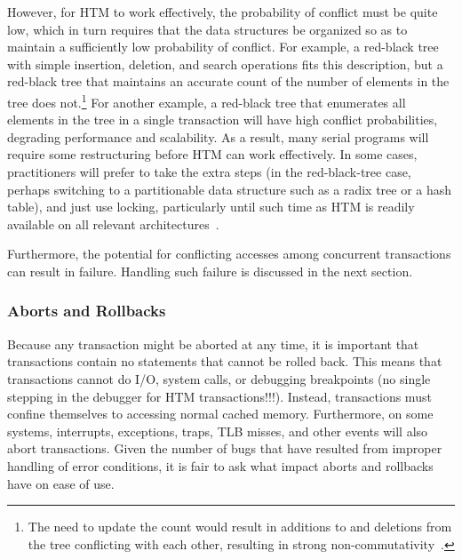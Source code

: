 However, for HTM to work effectively, the probability of conflict must
be quite low, which in turn requires that the data structures
be organized so as to maintain a sufficiently low probability of conflict.
For example, a red-black tree with simple insertion, deletion, and search
operations fits this description, but a red-black
tree that maintains an accurate count of the number of elements in
the tree does not.\footnote{
	The need to update the count would result in additions to and
	deletions from the tree conflicting with each other, resulting
	in strong non-commutativity~\cite{HagitAttiya2011LawsOfOrder,Attiya:2011:LOE:1925844.1926442,PaulEMcKenney2011SNC}.}
For another example, a red-black tree that enumerates all elements in
the tree in a single transaction will have high conflict probabilities,
degrading performance and scalability.
As a result, many serial programs will require some restructuring before
HTM can work effectively.
In some cases, practitioners will prefer to take the extra steps
(in the red-black-tree case, perhaps switching to a partitionable
data structure such as a radix tree or a hash table), and just
use locking, particularly until such time as HTM is readily available
on all relevant
architectures~\cite{CliffClick2009AzulHTM}.

\QuickQuizEnd

Furthermore, the potential for conflicting accesses among concurrent
transactions can result in failure.
Handling such failure is discussed in the next section.

\subsubsection{Aborts and Rollbacks}
\label{sec:future:Aborts and Rollbacks}

Because any transaction might be aborted at any time, it is important
that transactions contain no statements that cannot be rolled back.
This means that transactions cannot do I/O, system calls, or debugging
breakpoints (no single stepping in the debugger for HTM transactions!!!).
Instead, transactions must confine themselves to accessing normal
cached memory.
Furthermore, on some systems, interrupts, exceptions, traps,
TLB misses, and other events will also abort transactions.
Given the number of bugs that have resulted from improper handling
of error conditions, it is fair to ask what impact aborts and rollbacks
have on ease of use.

